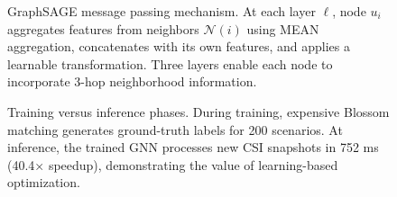 \begin{figure}[t]
\centering

\caption{GraphSAGE message passing mechanism. At each layer $\ell$, node $u_i$ aggregates features from neighbors $\mathcal{N}(i)$ using MEAN aggregation, concatenates with its own features, and applies a learnable transformation. Three layers enable each node to incorporate 3-hop neighborhood information.}
\label{fig:graphsage_detail}
\end{figure}

\begin{figure}[t]
\centering

\caption{Training versus inference phases. During training, expensive Blossom matching generates ground-truth labels for 200 scenarios. At inference, the trained GNN processes new CSI snapshots in 752 ms (40.4× speedup), demonstrating the value of learning-based optimization.}
\label{fig:training_inference}
\end{figure}



